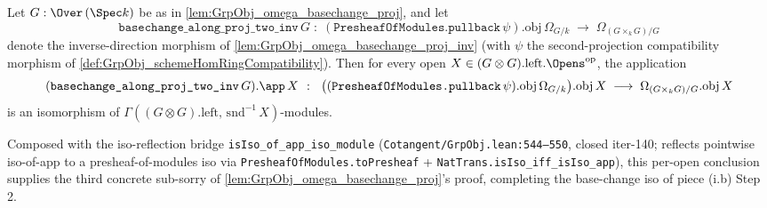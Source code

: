 \begin{lemma}
  \label{lem:GrpObj_basechange_along_proj_two_inv_app_isIso}
  
  \notready
  Let \(G : \Over\,(\Spec k)\) be as in \cref{lem:GrpObj_omega_basechange_proj}, and let
  \[
    \texttt{basechange\_along\_proj\_two\_inv}\,G \;\colon\;
    (\texttt{PresheafOfModules.pullback}\,\psi).\mathrm{obj}\,\Omega_{G/k}
    \;\longrightarrow\; \Omega_{(G \times_{k} G)/G}
  \]
  denote the inverse-direction morphism of \cref{lem:GrpObj_omega_basechange_proj_inv} (with \(\psi\) the second-projection compatibility morphism of \cref{def:GrpObj_schemeHomRingCompatibility}). Then for every open \(X \in (G \otimes G).\mathrm{left}.\Opens^{\mathrm{op}}\), the application
  \[
    (\texttt{basechange\_along\_proj\_two\_inv}\,G).\app\,X
    \;\;\colon\;\;
    \bigl((\texttt{PresheafOfModules.pullback}\,\psi).\mathrm{obj}\,\Omega_{G/k}\bigr).\mathrm{obj}\,X
    \;\longrightarrow\; \Omega_{(G \times_{k} G)/G}.\mathrm{obj}\,X
  \]
  is an isomorphism of \(\Gamma((G \otimes G).\mathrm{left},\,\mathrm{snd}^{-1}\,X)\)-modules.

  Composed with the iso-reflection bridge \texttt{isIso\_of\_app\_iso\_module} (\texttt{Cotangent/GrpObj.lean:544--550}, closed iter-140; reflects pointwise iso-of-app to a presheaf-of-modules iso via \texttt{PresheafOfModules.toPresheaf} + \texttt{NatTrans.isIso\_iff\_isIso\_app}), this per-open conclusion supplies the third concrete sub-sorry of \cref{lem:GrpObj_omega_basechange_proj}'s proof, completing the base-change iso of piece (i.b) Step 2.
\end{lemma}

